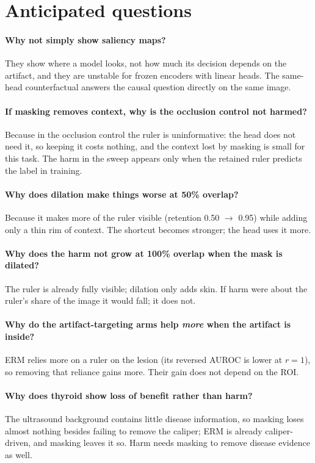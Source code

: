 \section{Anticipated questions}
\paragraph{Why not simply show saliency maps?} They show where a model looks, not how much its decision depends on the
artifact, and they are unstable for frozen encoders with linear heads. The same-head counterfactual answers the causal
question directly on the same image.
\paragraph{If masking removes context, why is the occlusion control not harmed?} Because in the occlusion control the
ruler is uninformative: the head does not need it, so keeping it costs nothing, and the context lost by masking is
small for this task. The harm in the sweep appears only when the retained ruler predicts the label in training.
\paragraph{Why does dilation make things worse at 50\% overlap?} Because it makes more of the ruler visible (retention
0.50 $\to$ 0.95) while adding only a thin rim of context. The shortcut becomes stronger; the head uses it more.
\paragraph{Why does the harm not grow at 100\% overlap when the mask is dilated?} The ruler is already fully visible;
dilation only adds skin. If harm were about the ruler's share of the image it would fall; it does not.
\paragraph{Why do the artifact-targeting arms help \emph{more} when the artifact is inside?} ERM relies more on a ruler
on the lesion (its reversed AUROC is lower at $r=1$), so removing that reliance gains more. Their gain does not depend
on the ROI.
\paragraph{Why does thyroid show loss of benefit rather than harm?} The ultrasound background contains little disease
information, so masking loses almost nothing besides failing to remove the caliper; ERM is already caliper-driven, and
masking leaves it so. Harm needs masking to remove disease evidence as well.
